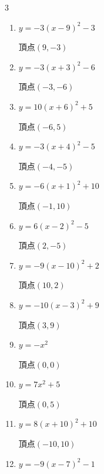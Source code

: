 \begin{multicols}{3}
\begin{enumerate}
        $\displaystyle 頂点\left( 1 , -1 \right)$

  \item $\displaystyle y=-3\left( x-9\right)^{2}-3$

        $\displaystyle 頂点\left( 9 , -3 \right)$

  \item $\displaystyle y=-3\left( x+3\right)^{2}-6$

        $\displaystyle 頂点\left( -3 , -6 \right)$

  \item $\displaystyle y=10\left( x+6\right)^{2}+5$

        $\displaystyle 頂点\left( -6 , 5 \right)$

  \item $\displaystyle y=-3\left( x+4\right)^{2}-5$

        $\displaystyle 頂点\left( -4 , -5 \right)$

\columnbreak %

  \item $\displaystyle y=-6\left( x+1\right)^{2}+10$

        $\displaystyle 頂点\left( -1 , 10 \right)$

  \item $\displaystyle y=6\left( x-2\right)^{2}-5$

        $\displaystyle 頂点\left( 2 , -5 \right)$

  \item $\displaystyle y=-9\left( x-10\right)^{2}+2$

        $\displaystyle 頂点\left( 10 , 2 \right)$

  \item $\displaystyle y=-10\left( x-3\right)^{2}+9$

        $\displaystyle 頂点\left( 3 , 9 \right)$

  \item $\displaystyle y=-x^{2}$

        $\displaystyle 頂点\left( 0 , 0 \right)$

  \item $\displaystyle y=7x^{2}+5$

        $\displaystyle 頂点\left( 0 , 5 \right)$

  \item $\displaystyle y=8\left( x+10\right)^{2}+10$

        $\displaystyle 頂点\left( -10 , 10 \right)$

  \item $\displaystyle y=-9\left( x-7\right)^{2}-1$


\end{enumerate}
\end{multicols}
